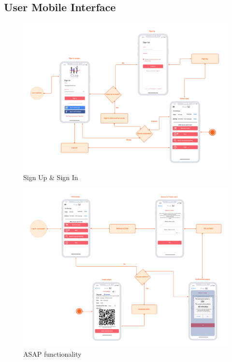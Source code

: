 \documentclass[table, 12pt]{article}
\begin{document}
\subsection{User Mobile Interface}
\begin{center}
    \begin{figure}[H]
        \includegraphics[width=\textwidth]{assets/User-Interface-Design/SignIn_SingUp_User.png}
        \caption{Sign Up \& Sign In}
    \end{figure}
\end{center}

\begin{center}
    \begin{figure}[H]
        \includegraphics[width=\textwidth]{assets/User-Interface-Design/retrieve_a_ticket_User.png}
        \caption{ASAP functionality}
    \end{figure}
\end{center}
\end{document}
